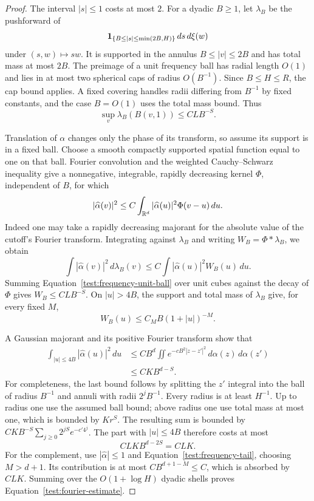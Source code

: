 \begin{proof}
The interval $|s|\le1$ costs at most $2$.  For a dyadic $B\ge1$,
let $\lambda_B$ be the pushforward of
\[
\mathbf 1_{\{B\le|s|\le\min(2B,H)\}}\,ds\,d\xi(w)
\]
under $(s,w)\mapsto sw$.  It is supported in the annulus
$B\le|v|\le2B$ and has total mass at most $2B$.
The preimage of a unit frequency ball has radial length $O(1)$ and
lies in at most two spherical caps of radius $O(B^{-1})$.
Since $B\le H\le R$, the cap bound applies.  A fixed covering handles
radii differing from $B^{-1}$ by fixed constants, and the case
$B=O(1)$ uses the total mass bound.  Thus
\begin{equation}\label{test:frequency-unit-ball}
\sup_v\lambda_B(B(v,1))\le C LB^{-S}.
\end{equation}

Translation of $\alpha$ changes only the phase of its transform, so
assume its support is in a fixed ball.  Choose a smooth compactly
supported spatial function equal to one on that ball.  Fourier
convolution and the weighted Cauchy--Schwarz inequality give a
nonnegative, integrable, rapidly decreasing kernel $\Phi$, independent
of $B$, for which
\[
|\widehat\alpha(v)|^2
 \le C\int_{\mathbb R^d}|\widehat\alpha(u)|^2\Phi(v-u)\,du.
\]
Indeed one may take a rapidly decreasing majorant for the absolute
value of the cutoff's Fourier transform.  Integrating against
$\lambda_B$ and writing $W_B=\Phi*\lambda_B$, we obtain
\[
\int|\widehat\alpha(v)|^2\,d\lambda_B(v)
 \le C\int|\widehat\alpha(u)|^2W_B(u)\,du.
\]
Summing Equation~\eqref{test:frequency-unit-ball} over unit cubes
against the decay of $\Phi$ gives $W_B\le CLB^{-S}$.  On $|u|>4B$,
the support and total mass of $\lambda_B$ give, for every fixed $M$,
\begin{equation}\label{test:frequency-tail}
W_B(u)\le C_M B(1+|u|)^{-M}.
\end{equation}

A Gaussian majorant and its positive Fourier transform show that
\[
\begin{split}
\int_{|u|\le4B}|\widehat\alpha(u)|^2\,du
&\le CB^d\iint e^{-cB^2|z-z'|^2}\,d\alpha(z)\,d\alpha(z')\\
&\le CKB^{d-S}.
\end{split}
\]
For completeness, the last bound follows by splitting the $z'$ integral
into the ball of radius $B^{-1}$ and annuli with radii
$2^jB^{-1}$.  Every radius is at least $H^{-1}$.  Up to radius one
use the assumed ball bound; above radius one use total mass at most
one, which is bounded by $Kr^S$.  The resulting sum is bounded by
$CKB^{-S}\sum_{j\ge0}2^{jS}e^{-c'4^j}$.
The part with $|u|\le4B$ therefore costs at most
\[
CLK B^{d-2S}=CLK.
\]
For the complement, use $|\widehat\alpha|\le1$ and
Equation~\eqref{test:frequency-tail}, choosing $M>d+1$.  Its
contribution is at most $C B^{d+1-M}\le C$, which is absorbed by
$CLK$.  Summing over the $O(1+\log H)$ dyadic shells proves
Equation~\eqref{test:fourier-estimate}.
\end{proof}

